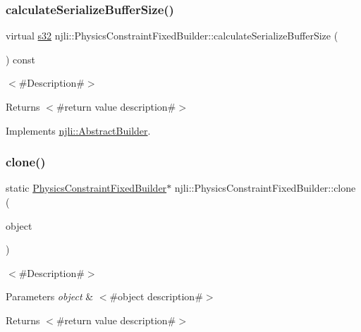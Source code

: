 \subsubsection{\texorpdfstring{calculate\+Serialize\+Buffer\+Size()}{calculateSerializeBufferSize()}}
{\footnotesize\ttfamily virtual \mbox{\hyperlink{_util_8h_aa62c75d314a0d1f37f79c4b73b2292e2}{s32}} njli\+::\+Physics\+Constraint\+Fixed\+Builder\+::calculate\+Serialize\+Buffer\+Size (\begin{DoxyParamCaption}{ }\end{DoxyParamCaption}) const\hspace{0.3cm}{\ttfamily [virtual]}}

$<$\#\+Description\#$>$

\begin{DoxyReturn}{Returns}
$<$\#return value description\#$>$ 
\end{DoxyReturn}


Implements \mbox{\hyperlink{classnjli_1_1_abstract_builder_aa1d220053e182c37b31b427499c6eacf}{njli\+::\+Abstract\+Builder}}.

\mbox{\label{classnjli_1_1_physics_constraint_fixed_builder_af4326c3a53c9a8fce71472d6d4815a47}} 
\subsubsection{\texorpdfstring{clone()}{clone()}}
{\footnotesize\ttfamily static \mbox{\hyperlink{classnjli_1_1_physics_constraint_fixed_builder}{Physics\+Constraint\+Fixed\+Builder}}$\ast$ njli\+::\+Physics\+Constraint\+Fixed\+Builder\+::clone (\begin{DoxyParamCaption}\item[{const \mbox{\hyperlink{classnjli_1_1_physics_constraint_fixed_builder}{Physics\+Constraint\+Fixed\+Builder}} \&}]{object }\end{DoxyParamCaption})\hspace{0.3cm}{\ttfamily [static]}}

$<$\#\+Description\#$>$


\begin{DoxyParams}{Parameters}
{\em object} & $<$\#object description\#$>$\\
\hline
\end{DoxyParams}
\begin{DoxyReturn}{Returns}
$<$\#return value description\#$>$ 
\end{DoxyReturn}
\mbox{\label{classnjli_1_1_physics_constraint_fixed_builder_a279c0c26b9faad323068b428724bf091}} 
